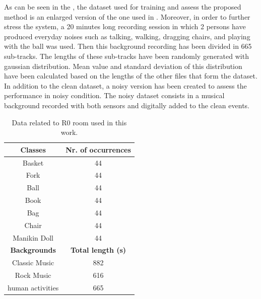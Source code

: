 As can be seen in the , the dataset used for training and assess the proposed method is an enlarged version of the one used in . Moreover, in order to further stress the system, a 20 minutes long recording session in which 2 persons have produced everyday noises such as talking, walking, dragging chairs, and playing with the ball was used. Then this background recording has been divided in 665 sub-tracks. The lengths of these sub-tracks have been randomly generated with gaussian distribution. Mean value and standard deviation of this distribution have been calculated based on the lengths of the other files that form the dataset. 
In addition to the clean dataset, a noisy version has been created to assess the performance in noisy condition. The noisy dataset consists in a musical background recorded with both sensors and digitally added to the clean events.


\begin{table}[t]
	\caption{Data related to R0 room used in this work.}
	\label{tab:binary_svm_dataset}
	\begin{center}
		\begin{tabular}[t]{c|c}
			
			\hline
			\textbf{Classes}  & \textbf{Nr. of occurrences} \\ %

			\hline
			
			Basket      			&   44    	\\
			Fork        			&   44     	\\
			Ball       				&   44    	\\
			Book        			&   44    	\\
			Bag         			&   44    	\\
			Chair       			&   44    	\\
			$\,$ Manikin Doll $\,$ 	&   44    	\\
			\hline
			\textbf{Backgrounds} & \textbf{Total length (s)}\\			
			Classic Music  			&   882   	\\
			Rock Music  			&   616   	\\
			human activities 		&   665		\\
			\hline
		\end{tabular}
	\end{center}
\end{table}

